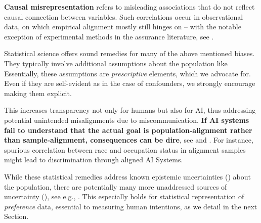 \documentclass{article}
\theoremstyle{plain}
\theoremstyle{definition}
\theoremstyle{remark}
\begin{document}
\textbf{Causal misrepresentation} refers to misleading associations that do not reflect causal connection between variables. Such correlations occur in observational data, on which empirical alignment mostly still hinges on -- with the notable exception of experimental methods in the assurance literature, see \citet[§4.3]{ji2023ai}. %

Statistical science offers sound remedies for many of the above mentioned biases. They typically involve additional assumptions about the population like  Essentially, these assumptions are \textit{prescriptive} elements, which we advocate for. Even if they are self-evident as in the case of confounders, we strongly encourage making them explicit. 

This increases transparency not only for humans but also for AI, thus addressing potential unintended misalignments due to miscommunication. \textbf{If AI systems fail to understand that the actual goal is population-alignment rather than sample-alignment, consequences can be dire}, see \citet[pages 122-125]{bostrom2014superintelligence} and \citet[Chapter 8]{harari2024nexus}. For instance, spurious correlation between race and occupation status in alignment samples might lead to discrimination through aligned AI Systems.  

While these statistical remedies address known epistemic uncertainties \cite{hullermeier2021aleatoric} () about the population, there are potentially many more unaddressed sources of uncertainty (), see e.g., \citet{rodemann2021accounting,rodemann2022accounting,rodemann2024imprecise}. This especially holds for statistical representation of \textit{preference} data, essential to measuring human intentions, as we detail in the next Section.   


    
\end{document}
